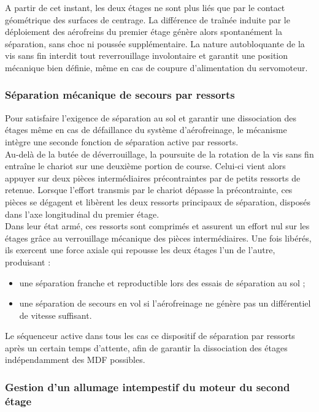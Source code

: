 A partir de cet instant, les deux étages ne sont plus liés que par le contact géométrique des surfaces de centrage. La
différence de traînée induite par le déploiement des aérofreins du premier étage génère alors spontanément la séparation, sans
choc ni poussée supplémentaire. La nature autobloquante de la vis sans fin interdit tout reverrouillage involontaire et garantit
une position mécanique bien définie, même en cas de coupure d'alimentation du servomoteur.

\subsubsection{Séparation mécanique de secours par ressorts}

Pour satisfaire l'exigence de séparation au sol et garantir une dissociation des étages même en cas de défaillance du système
d'aérofreinage, le mécanisme intègre une seconde fonction de séparation active par ressorts.\\

Au-delà de la butée de déverrouillage, la poursuite de la rotation de la vis sans fin entraîne le chariot sur une deuxième
portion de course. Celui-ci vient alors appuyer sur deux pièces intermédiaires précontraintes par de petits ressorts de
retenue. Lorsque l'effort transmis par le chariot dépasse la précontrainte, ces pièces se dégagent et libèrent les deux ressorts
principaux de séparation, disposés dans l'axe longitudinal du premier étage.\\

Dans leur état armé, ces ressorts sont comprimés et assurent un effort nul sur les étages grâce au verrouillage mécanique des
pièces intermédiaires. Une fois libérés, ils exercent une force axiale qui repousse les deux étages l'un de l'autre, produisant :
\begin{itemize}
    \item une séparation franche et reproductible lors des essais de séparation au sol ;
    \item une séparation de secours en vol si l'aérofreinage ne génère pas un différentiel de vitesse suffisant.\\
\end{itemize}

Le séquenceur active dans tous les cas ce dispositif de séparation par ressorts après un certain temps d'attente, afin de
garantir la dissociation des étages indépendamment des \acrlong{MDF} possibles.

\subsubsection{Gestion d'un allumage intempestif du moteur du second étage}

